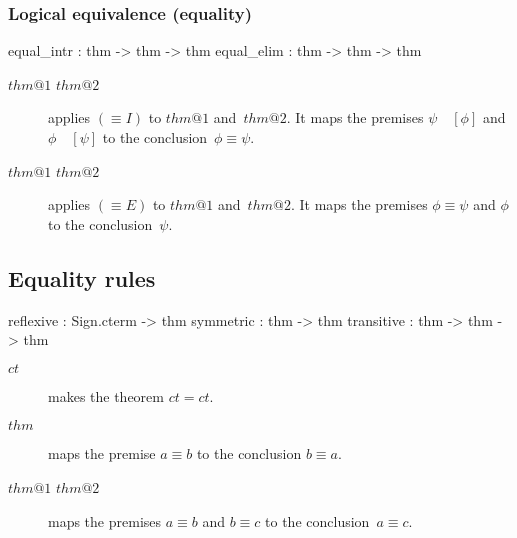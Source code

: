 \subsubsection{Logical equivalence (equality)}
\begin{ttbox} 
equal_intr : thm -> thm -> thm equal_elim : thm -> thm -> thm
\end{ttbox}
\begin{description}
\item[ $thm@1$ $thm@2$] 
applies $({\equiv}I)$ to $thm@1$ and~$thm@2$.  It maps the premises
$\psi\quad[\phi]$ and $\phi\quad[\psi]$ to the conclusion~$\phi\equiv\psi$.

\item[ $thm@1$ $thm@2$] 
applies $({\equiv}E)$ to $thm@1$ and~$thm@2$.  It maps the premises
$\phi\equiv\psi$ and $\phi$ to the conclusion~$\psi$.
\end{description}


\subsection{Equality rules}
\begin{ttbox} 
reflexive  : Sign.cterm -> thm
symmetric  : thm -> thm
transitive : thm -> thm -> thm
\end{ttbox}
\begin{description}
\item[ $ct$] 
makes the theorem \(ct=ct\). 

\item[ $thm$] 
maps the premise $a\equiv b$ to the conclusion $b\equiv a$.

\item[ $thm@1$ $thm@2$] 
maps the premises $a\equiv b$ and $b\equiv c$ to the conclusion~${a\equiv c}$.
\end{description}


